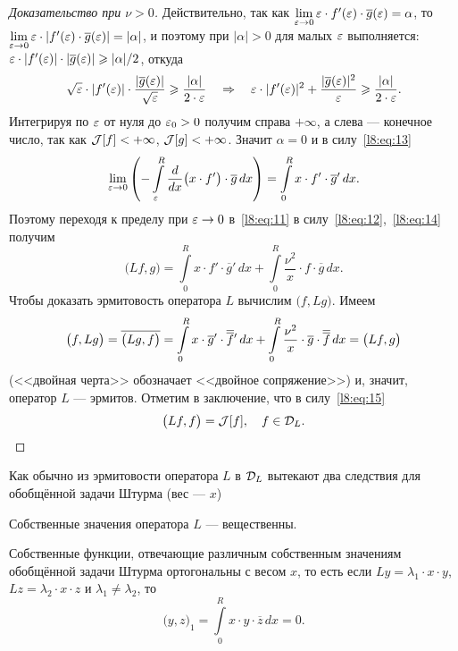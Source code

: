 \begin{proof}[Доказательство при $\nu>0$]
	Действительно, так как $\lim\limits_{\varepsilon\to0}\varepsilon\cdot f'(\varepsilon)\cdot\overline{g}(\varepsilon)=\alpha$, то $\lim\limits_{\eps\to0}\eps\cdot |f'(\eps)\cdot\overline{g}(\eps)|\?=|\alpha|$, и поэтому при $|\alpha|>0$ для малых $\varepsilon$ выполняется: $\eps\cdot|f'(\eps)|\cdot|\overline{g}(\eps)|\?\geqslant|\alpha|/2$, откуда 
	\begin{equation*}
		\sqrt{\varepsilon}\cdot|f'(\varepsilon)|\cdot\frac{|\overline{g}(\varepsilon)|}{\sqrt{\varepsilon}}\geqslant\frac{|\alpha|}{2\cdot\varepsilon}\quad\Rightarrow\quad\varepsilon\cdot|f'(\varepsilon)|^2+\frac{|\overline{g}(\varepsilon)|^2}{\varepsilon}\geqslant\frac{|\alpha|}{2\cdot\varepsilon}.
	\end{equation*}
	Интегрируя по $\varepsilon$ от нуля до $\varepsilon_0>0$ получим справа $+\infty$, а слева --- конечное число, так как $\mathcal{J}[f]<+\infty$, $\mathcal{J}[g]<+\infty$. Значит $\alpha=0$ и в силу~\eqref{l8:eq:13} 
	\begin{equation}\label{l8:eq:14}
		\lim\limits_{\varepsilon\to0}\left(-\int\limits_{\varepsilon}^R\frac{d}{dx}\big(x\cdot f'\big)\cdot\overline{g}\,dx\right)=\int\limits_{0}^{R}x\cdot f'\cdot\overline{g}'\,dx.
	\end{equation}
	Поэтому переходя к пределу при $\varepsilon\to0$ в~\eqref{l8:eq:11} в силу~\eqref{l8:eq:12},~\eqref{l8:eq:14} получим
	\begin{equation}\label{l8:eq:15}
		\big(Lf,g\big)=\int\limits_0^R x\cdot f'\cdot\overline{g}'\,dx+\int\limits_{0}^{R}\frac{\nu^2}{x}\cdot f\cdot\overline{g}\,dx.
	\end{equation}
	Чтобы доказать эрмитовость оператора $L$ вычислим $\big(f,Lg\big)$. Имеем
	\begin{equation*}
		\big(f,Lg\big)=\overline{\big(Lg,f\big)}=\int\limits_0^R x\cdot \overline{g}'\cdot\overline{\overline{f}}\vphantom{f}'\,dx+\int\limits_{0}^{R}\frac{\nu^2}{x}\cdot \overline{g}\cdot\overline{\overline{f}}\,dx=\big(Lf,g\big)
	\end{equation*}
	(<<двойная черта>> обозначает <<двойное сопряжение>>) и, значит, оператор $L$ --- эрмитов. Отметим в заключение, что в силу~\eqref{l8:eq:15} 
	\begin{equation*}
		\big(Lf,f\big)=\mathcal{J}[f],\quad f\in\mathcal{D}_L.
	\end{equation*} 
\end{proof}

Как обычно из эрмитовости оператора $L$ в $\mathcal{D}_L$ вытекают два следствия для обобщённой задачи Штурма (вес --- $x$) 
\begin{enumerateD}
	\item Собственные значения оператора $L$ --- вещественны.
	\item Собственные функции, отвечающие различным собственным значениям обобщённой задачи Штурма ортогональны с весом $x$, то есть если $Ly=\lambda_1\cdot x\cdot y$, $Lz=\lambda_2\cdot x\cdot z$ и $\lambda_1\neq\lambda_2$, то 
	\begin{equation*}
		\big(y,z\big)_1=\int\limits_0^R x\cdot y\cdot\overline{z}\,dx=0.
	\end{equation*}
\end{enumerateD} 